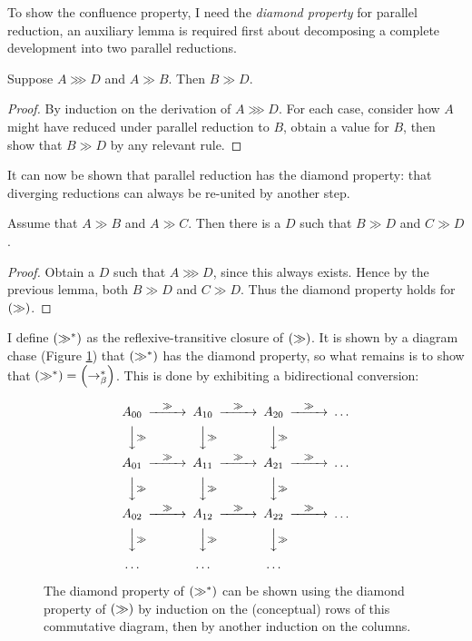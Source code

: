 To show the confluence property, I need the \emph{diamond property} for parallel reduction, an auxiliary lemma is required first about decomposing a complete development into two parallel reductions.

\begin{lemma}
Suppose \(A \ggg D\) and \(A \gg B\).
Then \(B \gg D\).
\end{lemma}
\begin{proof}
By induction on the derivation of \(A \ggg D\).
For each case, consider how \(A\) might have reduced under parallel reduction to \(B\), obtain a value for \(B\), then show that \(B \gg D\) by any relevant rule.
\end{proof}

It can now be shown that parallel reduction has the diamond property: that diverging reductions can always be re-united by another step.

\begin{lemma}
Assume that \(A \gg B\) and \(A \gg C\).
Then there is a \(D\) such that \(B \gg D\) and \(C \gg D\).
\end{lemma}
\begin{proof}
Obtain a \(D\) such that \(A \ggg D\), since this always exists.
Hence by the previous lemma, both \(B \gg D\) and \(C \gg D\).
Thus the diamond property holds for \(\left(\gg\right)\).
\end{proof}

I define \(\left(\gg^*\right)\) as the reflexive-transitive closure of \(\left(\gg\right)\).
It is shown by a diagram chase (Figure \ref{fig:diagram-chase}) that \(\left(\gg^*\right)\) has the diamond property, so what remains is to show that \(\left(\gg^*\right) = \left(\to_\beta^*\right)\).
This is done by exhibiting a bidirectional conversion:

\begin{figure}
\[
\begin{CD}
A_{00}	@>\gg>>	A_{10}	@>\gg>>	A_{20}	@>\gg>>	\ldots\\
@VV\gg{}V	@VV\gg{}V	@VV\gg{}V\\
A_{01}	@>\gg>>	A_{11}	@>\gg>>	A_{21}	@>\gg>>	\ldots\\
@VV\gg{}V	@VV\gg{}V	@VV\gg{}V\\
A_{02}	@>\gg>>	A_{12}	@>\gg>>	A_{22}	@>\gg>>	\ldots\\
@VV\gg{}V	@VV\gg{}V	@VV\gg{}V\\
\ldots&		&\ldots&	&\ldots\\
\end{CD}
\]
\caption{The diamond property of \(\left(\gg^*\right)\) can be shown using the diamond property of \(\left(\gg\right)\) by induction on the (conceptual) rows of this commutative diagram, then by another induction on the columns.}
\label{fig:diagram-chase}
\end{figure}

